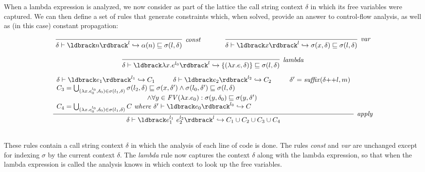 \documentclass[11pt]{article}
\newcommand{\parg}[1] %
  {\ldbrack #1 \rdbrack}
\newcommand{\alap}{\sqsubseteq}
\newcommand{\todo}[1]{}
\begin{document}
\todo{The cleanest way to express this is probably as a set of forward inference rules.  If you know X and Y, then you can learn Z.  Then the result is the greatest set of facts derivable from the rules and axioms (e.g. an axiom is the analysis of main).}

When a lambda expression is analyzed, we now consider as part of the lattice the call string context $\delta$ in which its free variables were captured.
%
We can then define a set of rules that generate constraints which, when solved, provide an answer to control-flow analysis, as well as (in this case) constant propagation:

\[
\begin{array}{ccc}
\infer[\textit{const}]
	{\delta \vdash \parg{n}^l \hookrightarrow \alpha(n) \alap \sigma(l, \delta)}
	{}
	& ~~~~~ &
	
\infer[\textit{var}]
	{\delta \vdash \parg{x}^l \hookrightarrow \sigma(x, \delta) \alap \sigma(l, \delta)}
	{}\\
\end{array}
\]

\[
\begin{array}{c}
\infer[\textit{lambda}]
	{\delta \vdash \parg{\lambda x . e^{l_0}}^l \hookrightarrow \{(\lambda x . e, \delta)\} \alap \sigma(l, \delta)}
	{}\\[2ex]
	
\infer[\textit{apply}]
	{\delta \vdash \parg{e_1^{l_1} ~ e_2^{l_2}}^l \hookrightarrow C_1 \cup C_2 \cup C_3 \cup C_4}
	{\begin{array}{l}
		\delta \vdash \parg{e_1}^{l_1} \hookrightarrow C_1 ~~~~~~~~ \delta \vdash \parg{e_2}^{l_2} \hookrightarrow C_2 ~~~~~~~~ \delta' = \mathit{suffix}(\delta {+}{+} l, m) \\
		C_3 = \bigcup_{(\lambda x . e_0^{l_0}, \delta_0) \in \sigma(l_1, \delta)}  \sigma(l_2,\delta) \alap \sigma(x,\delta') \land \sigma(l_0,\delta') \alap \sigma(l,\delta) \\
		~~~~~~~~~~~~~~~~ ~~~~~~~~~~~~~~~~ ~~~~~~~~ \land \forall y \in \mathit{FV}(\lambda x . e_0): \sigma(y,\delta_0) \alap \sigma(y, \delta') \\
		C_4 = \bigcup_{(\lambda x . e_0^{l_0}, \delta_0) \in \sigma(l_1, \delta)} C ~\mathit{where}~ \delta' \vdash \parg{e_0}^{l_0} \hookrightarrow C
	\end{array}
	}\\[3ex]
	
\end{array}
\]

These rules contain a call string context $\delta$ in which the analysis of each line of code is done.  The rules \textit{const} and \textit{var} are unchanged except for indexing $\sigma$ by the current context $\delta$.  The \textit{lambda} rule now captures the context $\delta$ along with the lambda expression, so that when the lambda expression is called the analysis knows in which context to look up the free variables.
\end{document}
